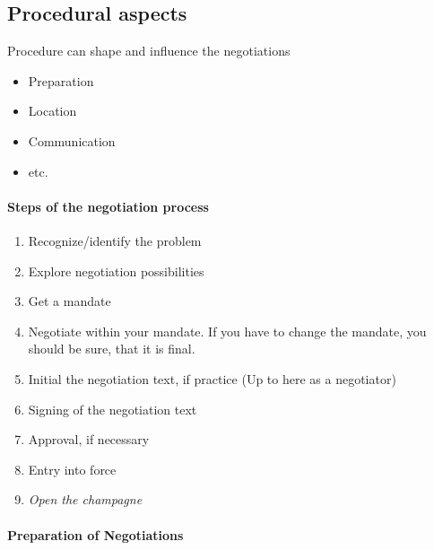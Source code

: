 \subsection{Procedural aspects}

Procedure can shape and influence the negotiations
\begin{itemize}
    \item Preparation
    \item Location
    \item Communication
    \item etc.
\end{itemize}

\paragraph{Steps of the negotiation process}

\begin{enumerate}
    \item Recognize/identify the problem
    \item Explore negotiation possibilities
    \item Get a mandate
    \item Negotiate within your mandate. If you have to change the mandate,
        you should be sure, that it is final.
    \item Initial the negotiation text, if practice (Up to here as a negotiator)
    \item Signing of the negotiation text
    \item Approval, if necessary
    \item Entry into force
    \item \textit{Open the champagne}
\end{enumerate}

\paragraph{Preparation of Negotiations}

